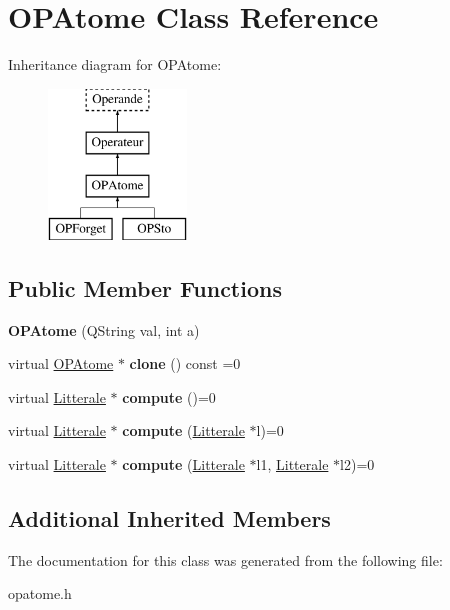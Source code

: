 \hypertarget{class_o_p_atome}{}\section{O\+P\+Atome Class Reference}
\label{class_o_p_atome}
Inheritance diagram for O\+P\+Atome\+:\begin{figure}[H]
\begin{center}
\leavevmode
\includegraphics[height=4.000000cm]{class_o_p_atome}
\end{center}
\end{figure}
\subsection*{Public Member Functions}
\begin{DoxyCompactItemize}
\item 
{\bfseries O\+P\+Atome} (Q\+String val, int a)\hypertarget{class_o_p_atome_aa47784bcda6dab75a621d2d8e0dcbb78}{}\label{class_o_p_atome_aa47784bcda6dab75a621d2d8e0dcbb78}

\item 
virtual \hyperlink{class_o_p_atome}{O\+P\+Atome} $\ast$ {\bfseries clone} () const  =0\hypertarget{class_o_p_atome_a15ce92ba697325a96a37b35218266ae6}{}\label{class_o_p_atome_a15ce92ba697325a96a37b35218266ae6}

\item 
virtual \hyperlink{class_litterale}{Litterale} $\ast$ {\bfseries compute} ()=0\hypertarget{class_o_p_atome_a3251b1758ab0806376472ca8e93e6389}{}\label{class_o_p_atome_a3251b1758ab0806376472ca8e93e6389}

\item 
virtual \hyperlink{class_litterale}{Litterale} $\ast$ {\bfseries compute} (\hyperlink{class_litterale}{Litterale} $\ast$l)=0\hypertarget{class_o_p_atome_af3a80639cbea23c292c738650d0f7fa7}{}\label{class_o_p_atome_af3a80639cbea23c292c738650d0f7fa7}

\item 
virtual \hyperlink{class_litterale}{Litterale} $\ast$ {\bfseries compute} (\hyperlink{class_litterale}{Litterale} $\ast$l1, \hyperlink{class_litterale}{Litterale} $\ast$l2)=0\hypertarget{class_o_p_atome_ac610442d3bc2da08ed80698bcbd0e095}{}\label{class_o_p_atome_ac610442d3bc2da08ed80698bcbd0e095}

\end{DoxyCompactItemize}
\subsection*{Additional Inherited Members}


The documentation for this class was generated from the following file\+:\begin{DoxyCompactItemize}
\item 
opatome.\+h\end{DoxyCompactItemize}
